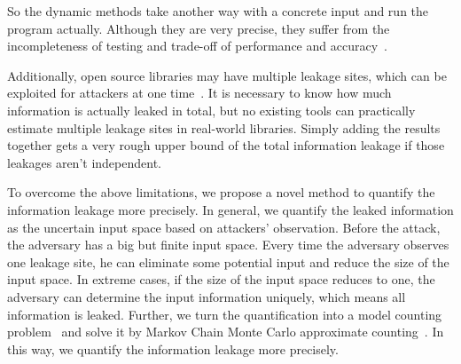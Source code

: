So the dynamic methods take another way with a concrete input and run the program actually. 
Although they are very precise, they suffer from the incompleteness of testing 
and trade-off of performance and accuracy~\cite{}. 

Additionally, open source libraries may have multiple leakage sites, which can be exploited for attackers
at one time~\cite{191010,7163052,hornby2011side}. 
It is necessary to know how much information is actually leaked in total, 
but no existing tools can practically estimate multiple leakage sites in real-world libraries.
Simply adding the results together gets a very rough upper bound of the total information leakage if those 
leakages aren’t independent. 

To overcome the above limitations, we propose a novel method
to quantify the information leakage more precisely. 
In general, we quantify the leaked information as the uncertain input space based on attackers' observation.
Before the attack, the adversary has a big but finite input space.
Every time the adversary observes one leakage site, he can eliminate some potential input and
reduce the size of the input space. 
In extreme cases, if the size of the input space reduces to one, 
the adversary can determine the input information uniquely, which means all information is leaked. 
Further, we turn the quantification into a model counting problem~\cite{bibid} 
and solve it by Markov Chain Monte Carlo approximate counting~\cite{bibid}. 
In this way, we quantify the information leakage more precisely.


